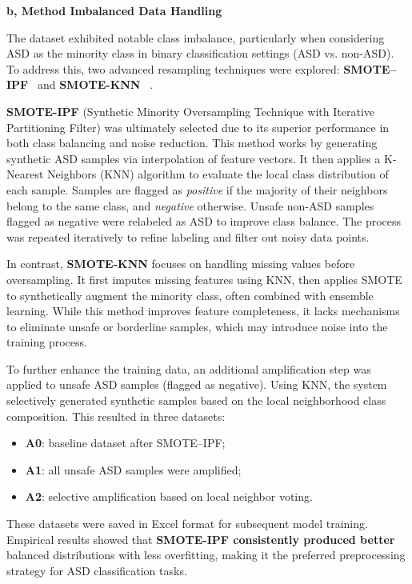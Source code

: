 \documentclass[conference]{IEEEtran}
\begin{document}
\textbf{b, Method Imbalanced Data Handling}

The dataset exhibited notable class imbalance, particularly when considering ASD as the minority class in binary classification settings (ASD vs. non-ASD). To address this, two advanced resampling techniques were explored: \textbf{SMOTE–IPF}~\cite{b14} and \textbf{SMOTE-KNN} ~\cite{b15}.

\textbf{SMOTE-IPF} (Synthetic Minority Oversampling Technique with Iterative Partitioning Filter) was ultimately selected due to its superior performance in both class balancing and noise reduction. This method works by generating synthetic ASD samples via interpolation of feature vectors. It then applies a K-Nearest Neighbors (KNN) algorithm to evaluate the local class distribution of each sample. Samples are flagged as \textit{positive} if the majority of their neighbors belong to the same class, and \textit{negative} otherwise. Unsafe non-ASD samples flagged as negative were relabeled as ASD to improve class balance. The process was repeated iteratively to refine labeling and filter out noisy data points.

In contrast, \textbf{SMOTE-KNN} focuses on handling missing values before oversampling. It first imputes missing features using KNN, then applies SMOTE to synthetically augment the minority class, often combined with ensemble learning. While this method improves feature completeness, it lacks mechanisms to eliminate unsafe or borderline samples, which may introduce noise into the training process.

To further enhance the training data, an additional amplification step was applied to unsafe ASD samples (flagged as negative). Using KNN, the system selectively generated synthetic samples based on the local neighborhood class composition. This resulted in three datasets:
\begin{itemize}
    \item \textbf{A0}: baseline dataset after SMOTE–IPF;
    \item \textbf{A1}: all unsafe ASD samples were amplified;
    \item \textbf{A2}: selective amplification based on local neighbor voting.
\end{itemize}

These datasets were saved in Excel format for subsequent model training. Empirical results showed that \textbf{SMOTE-IPF consistently produced better} balanced distributions with less overfitting, making it the preferred preprocessing strategy for ASD classification tasks.
\end{document}
